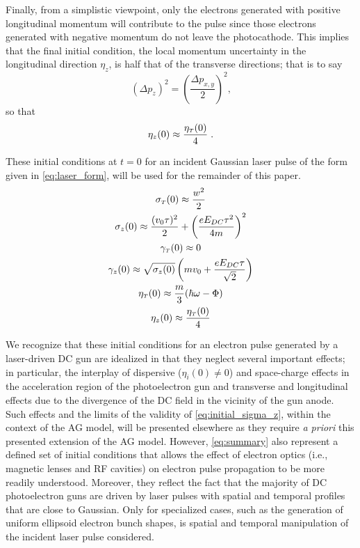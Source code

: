 Finally, from a simplistic viewpoint, only the electrons generated with positive longitudinal momentum will contribute to the pulse since those electrons generated with negative momentum do not leave the photocathode.
This implies that the final initial condition, the local momentum uncertainty in the longitudinal direction $\eta_z$, is half that of the transverse directions; that is to say
\begin{equation}
  ( \Delta p_{ z } )^{2} = \left ( \frac{\Delta p_{ x , y }}{ 2 } \right )^{2} \text{,}
\end{equation}
so that
\begin{equation}
  \eta_{ z } ( 0 ) \approx \frac{ \eta_{ {\scriptscriptstyle T} } ( 0 )}{ 4 } \; \text{.}
\end{equation}

These initial conditions at $t=0$ for an incident Gaussian laser pulse of the form given in \ref{eq:laser_form}, will be used for the remainder of this paper.
\begin{subequations} \label{eq:summary}
  \begin{gather}
    \sigma_{ {\scriptscriptstyle T} } ( 0 ) \approx \frac{ w^{ 2 } }{ 2 } \\
    \sigma_{ z } ( 0 ) \approx \frac{ ( v_{ 0 } \tau )^{ 2 } }{ 2 } + \left ( \frac{ e E_{ DC } \tau^{ 2 } }{ 4 m } \right )^{ 2 } \\
    \gamma_{ {\scriptscriptstyle T} } ( 0 ) \approx 0 \\
    \gamma_{ z } ( 0 ) \approx \sqrt{ \sigma_{ z } ( 0 ) } \left ( m v_{ 0 } + \frac{ e E_{DC} \tau }{ \sqrt{ 2 } } \right ) \\
    \eta_{ {\scriptscriptstyle T} } ( 0 ) \approx \frac{ m }{ 3 } ( \hbar \omega - \Phi ) \\
    \eta_{ z } ( 0 ) \approx \frac{ \eta_{ {\scriptscriptstyle T} } ( 0 ) }{ 4 }
  \end{gather}
\end{subequations}

We recognize that these initial conditions for an electron pulse generated by a laser-driven DC gun are idealized in that they neglect several important effects; in particular, the interplay of dispersive ($ \eta_{i}(0) \neq 0 $) and space-charge effects in the acceleration region of the photoelectron gun and transverse and longitudinal effects due to the divergence of the DC field in the vicinity of the gun anode.\cite{berger_dc_2009,togawa_ceb6_2007}
Such effects and the limits of the validity of \ref{eq:initial_sigma_z}, within the context of the AG model, will be presented elsewhere as they require \textit{a priori} this presented extension of the AG model.
However, \ref{eq:summary} also represent a defined set of initial conditions that allows the effect of electron optics (i.e., magnetic lenses and RF cavities) on electron pulse propagation to be more readily understood.
Moreover, they reflect the fact that the majority of DC photoelectron guns are driven by laser pulses with spatial and temporal profiles that are close to Gaussian.\cite{williamson_clocking_1997,sciaini_electronic_2009}
Only for specialized cases, such as the generation of uniform ellipsoid electron bunch shapes, is spatial and temporal manipulation of the incident laser pulse considered.\cite{luiten_how_2004,li_generating_2008}

